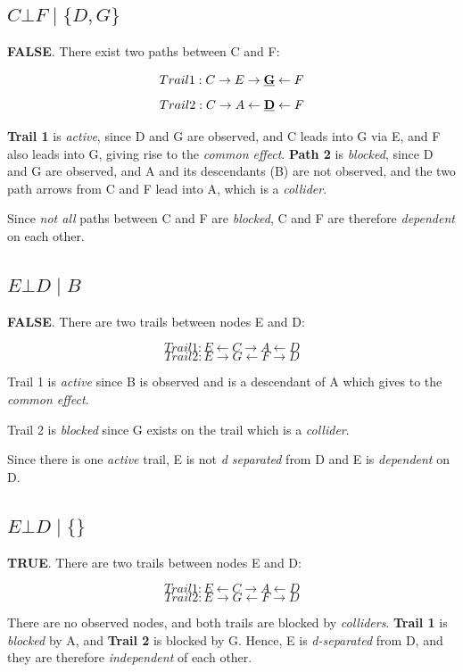 \documentclass[12pt, letterpaper]{article}
\begin{document}
\subsection{\(C\bot F\mid \{D,G\}\)}
\textbf{FALSE}. There exist two paths between C and F:

\[Trail 1: C \rightarrow E \rightarrow \textbf{\underline{G}} \leftarrow F\]
\[Trail 2: C \rightarrow A \leftarrow \textbf{\underline{D}} \leftarrow F\]

\textbf{Trail 1} is \textit{active}, since D and G are observed, and C leads into G via E, and F also leads into G, giving rise to the \textit{common effect}. 
\textbf{Path 2} is \textit{blocked}, since D and G are observed, and A and its descendants (B) are not observed, and the two path arrows from C and F lead into A, which is a \textit{collider}.

Since \emph{not all} paths between C and F are \textit{blocked}, C and F are therefore \textit{dependent} on each other.

\subsection{\(E\bot D\mid B\)}
\textbf{FALSE}. There are two trails between nodes E and D:

\[Trail 1: E \leftarrow C \rightarrow A \leftarrow D\]
\[Trail 2: E \rightarrow G \leftarrow F \rightarrow D\]

Trail 1 is \textit{active} since B is observed and is a descendant of A which gives to the \textit{common effect}.

Trail 2 is \textit{blocked} since G exists on the trail which is a \textit{collider}. 

Since there is one \textit{active} trail, E is not \textit{d separated} from D and E is \textit{dependent} on D.

\subsection{\(E\bot D\mid \{\}\)}
\textbf{TRUE}. There are two trails between nodes E and D:

\[Trail 1: E \leftarrow C \rightarrow A \leftarrow D\]
\[Trail 2: E \rightarrow G \leftarrow F \rightarrow D\]

There are no observed nodes, and both trails are blocked by \textit{colliders}. 
\textbf{Trail 1} is \textit{blocked} by A, and \textbf{Trail 2} is blocked by G. Hence, E is \textit{d-separated} from D, and they are therefore \textit{independent} of each other.
\end{document}
